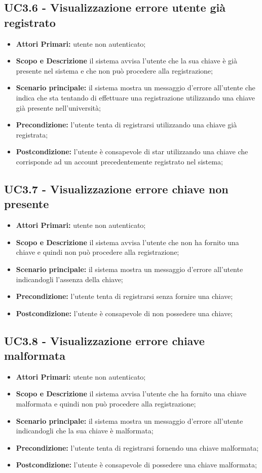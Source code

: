 \documentclass[AnalisiDeiRequisiti.tex]{subfiles}
\begin{document}
\subsection{UC3.6 - Visualizzazione errore utente già registrato}
\begin{itemize}
	\item \textbf{Attori Primari:} utente non autenticato;
	\item \textbf{Scopo e Descrizione} il sistema avvisa l'utente che la sua chiave è già presente nel sistema e che non può procedere alla registrazione;
	\item \textbf{Scenario principale:} il sistema mostra un messaggio d'errore all'utente che indica che sta tentando di effettuare una registrazione utilizzando una chiave già presente nell'università;
	\item \textbf{Precondizione:} l'utente tenta di registrarsi utilizzando una chiave già registrata;
	\item \textbf{Postcondizione:} l'utente è consapevole di star utilizzando una chiave che corrisponde ad un account precedentemente registrato nel sistema;
\end{itemize}
\subsection{UC3.7 - Visualizzazione errore chiave non presente}
\begin{itemize}
	\item \textbf{Attori Primari:} utente non autenticato;
	\item \textbf{Scopo e Descrizione} il sistema avvisa l'utente che non ha fornito una chiave e quindi non può procedere alla registrazione;
	\item \textbf{Scenario principale:} il sistema mostra un messaggio d'errore all'utente indicandogli l'assenza della chiave;
	\item \textbf{Precondizione:} l'utente tenta di registrarsi senza fornire una chiave;
	\item \textbf{Postcondizione:} l'utente è consapevole di non possedere una chiave;
\end{itemize}
\subsection{UC3.8 - Visualizzazione errore chiave malformata}
\begin{itemize}
	\item \textbf{Attori Primari:} utente non autenticato;
	\item \textbf{Scopo e Descrizione} il sistema avvisa l'utente che ha fornito una chiave malformata e quindi non può procedere alla registrazione;
	\item \textbf{Scenario principale:} il sistema mostra un messaggio d'errore all'utente indicandogli che la sua chiave è malformata;
	\item \textbf{Precondizione:} l'utente tenta di registrarsi fornendo una chiave malformata;
	\item \textbf{Postcondizione:} l'utente è consapevole di possedere una chiave malformata;
\end{itemize}
\end{document}
